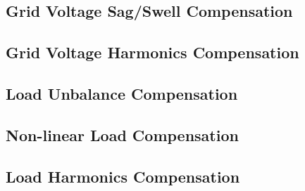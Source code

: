 \subsection{Grid Voltage Sag/Swell Compensation}

\subsection{Grid Voltage Harmonics Compensation}

\subsection{Load Unbalance Compensation}

\subsection{Non-linear Load Compensation}

\subsection{Load Harmonics Compensation}
